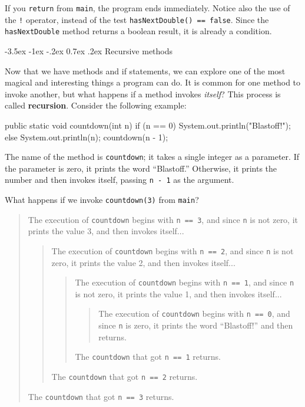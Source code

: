 \documentclass[12pt]{book}
\makeatletter
\theoremstyle{exercise}
\newcommand{\java}[1]{\verb"#1"}
\renewcommand{\section}{\@startsection{section}{1}{\z@}%
    {-3.5ex \@plus -1ex \@minus -.2ex}%
    {0.7ex \@plus.2ex}%
    {\normalfont\Large\bfseries}}
\newcommand{\java}[1]{\lstinline{#1}} %
\makeatother
\begin{document}
If you \java{return} from \java{main}, the program ends immediately.
Notice also the use of the \java{!} operator, instead of the test \java{hasNextDouble() == false}.
Since the \java{hasNextDouble} method returns a boolean result, it is already a condition.


\section{Recursive methods}
\label{recursion}


Now that we have methods and if statements, we can explore one of the most magical and interesting things a program can do.
It is common for one method to invoke another, but what happens if a method invokes {\em itself}?
This process is called {\bf recursion}.
Consider the following example:

\begin{code}
    public static void countdown(int n) {
        if (n == 0) {
            System.out.println("Blastoff!");
        } else {
            System.out.println(n);
            countdown(n - 1);
        }
    }
\end{code}

The name of the method is \java{countdown}; it takes a single integer as a parameter.
If the parameter is zero, it prints the word ``Blastoff.''
Otherwise, it prints the number and then invokes itself, passing \java{n - 1} as the argument.

What happens if we invoke \java{countdown(3)} from \java{main}?

\vspace{-1ex}
\begin{quote}
The execution of \java{countdown} begins with \java{n == 3}, and since \java{n} is not zero, it prints the value 3, and then invokes itself...
\begin{quote}
The execution of \java{countdown} begins with \java{n == 2}, and since \java{n} is not zero, it prints the value 2, and then invokes itself...
\begin{quote}
The execution of \java{countdown} begins with \java{n == 1}, and since \java{n} is not zero, it prints the value 1, and then invokes itself...
\begin{quote}
The execution of \java{countdown} begins with \java{n == 0}, and since \java{n} is zero, it prints the word ``Blastoff!'' and then returns.
\end{quote}
The \java{countdown} that got \java{n == 1} returns.
\end{quote}
The \java{countdown} that got \java{n == 2} returns.
\end{quote}
The \java{countdown} that got \java{n == 3} returns.
\end{quote}
\vspace{-1ex}
\end{document}
